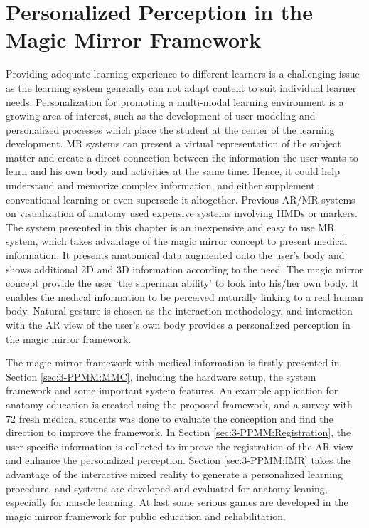 
\chapter{Personalized Perception in the Magic Mirror Framework}
Providing adequate learning experience to different learners is a challenging issue as the learning system generally can not adapt content to suit individual learner needs. Personalization for promoting a multi-modal learning environment is a growing area of interest, such as the development of user modeling and personalized processes which place the student at the center of the learning development.
MR systems can present a virtual representation of the subject matter and create a direct connection between the information the user wants to learn and his own body and activities at the same time. Hence, it could help understand and memorize complex information, and either supplement conventional learning or even supersede it altogether. 
Previous AR/MR systems on visualization of anatomy used expensive systems involving HMDs or markers. The system presented in this chapter is an inexpensive and easy to use MR system, which takes advantage of the magic mirror concept to present medical information. It presents anatomical data augmented onto the user's body and shows additional 2D and 3D information according to the need. The magic mirror concept provide the user `the superman ability' to look into his/her own body. It enables the medical information to be perceived naturally linking to a real human body. Natural gesture is chosen as the interaction methodology, and interaction with the AR view of the user's own body provides a personalized perception in the magic mirror framework.

The magic mirror framework with medical information is firstly presented in Section \ref{sec:3-PPMM:MMC}, including the hardware setup, the system framework and some important system features. An example application for anatomy education is created using the proposed framework, and a survey with 72 fresh medical students was done to evaluate the conception and find the direction to improve the framework. In Section \ref{sec:3-PPMM:Registration}, the user specific information is collected to improve the registration of the AR view and enhance the personalized perception. Section \ref{sec:3-PPMM:IMR} takes the advantage of the interactive mixed reality to generate a personalized learning procedure, and systems are developed and evaluated for anatomy leaning, especially for muscle learning. At last some serious games are developed in the magic mirror framework for public education and rehabilitation.


%
%